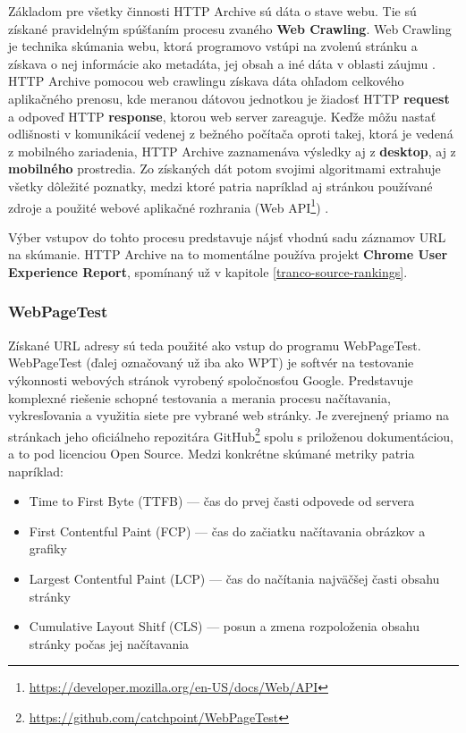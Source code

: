 Základom pre všetky činnosti HTTP Archive sú dáta o stave webu. Tie sú získané pravidelným spúšťaním procesu zvaného \textbf{Web Crawling}.
Web Crawling je technika skúmania webu, ktorá programovo vstúpi na zvolenú stránku a získava o nej informácie ako metadáta, jej obsah a iné dáta v oblasti záujmu \cite{httparchive-webcrawling}.
HTTP Archive pomocou web crawlingu získava dáta ohľadom celkového aplikačného prenosu, kde meranou dátovou jednotkou je žiadosť HTTP \textbf{request} a odpoveď HTTP \textbf{response}, ktorou web server zareaguje. 
Keďže môžu nastať odlišnosti v komunikácií vedenej z bežného počítača oproti takej, ktorá je vedená z mobilného zariadenia, HTTP Archive zaznamenáva výsledky aj z \textbf{desktop}, aj z \textbf{mobilného} prostredia.
Zo získaných dát potom svojimi algoritmami extrahuje všetky dôležité poznatky, medzi ktoré patria napríklad aj stránkou používané zdroje a použité webové aplikačné rozhrania (Web API\footnote{\href{https://developer.mozilla.org/en-US/docs/Web/API}{https://developer.mozilla.org/en-US/docs/Web/API}}) \cite{httparchive-homepage}.

Výber vstupov do tohto procesu predstavuje nájsť vhodnú sadu záznamov URL na skúmanie. 
HTTP Archive na to momentálne používa projekt \textbf{Chrome User Experience Report}, spomínaný už v kapitole \ref{tranco-source-rankings}.

\subsubsection{WebPageTest}

Získané URL adresy sú teda použité ako vstup do programu WebPageTest. WebPageTest (ďalej označovaný už iba ako WPT) je softvér na testovanie výkonnosti webových stránok vyrobený spoločnosťou Google. Predstavuje komplexné riešenie schopné testovania a merania procesu načítavania, vykresľovania a využitia siete pre vybrané web stránky. 
Je zverejnený priamo na stránkach jeho oficiálneho repozitára GitHub\footnote{\href{https://github.com/catchpoint/WebPageTest}{https://github.com/catchpoint/WebPageTest}} spolu s priloženou dokumentáciou, a to pod licenciou Open Source.
Medzi konkrétne skúmané metriky patria napríklad: \cite{webpagetest}
\begin{itemize}
    \item Time to First Byte (TTFB) --- čas do prvej časti odpovede od servera
    \item First Contentful Paint (FCP) --- čas do začiatku načítavania obrázkov a grafiky
    \item Largest Contentful Paint (LCP) --- čas do načítania najväčšej časti obsahu stránky 
    \item Cumulative Layout Shitf (CLS) --- posun a zmena rozpoloženia obsahu stránky počas jej načítavania
\end{itemize}

